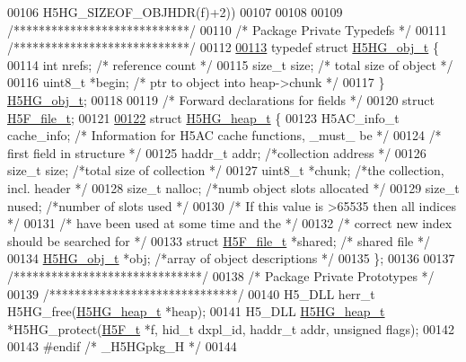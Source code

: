 \begin{DoxyCode}
00106 \textcolor{preprocessor}{                          H5HG\_SIZEOF\_OBJHDR(f)+2))}
00107 
00108 
00109 \textcolor{comment}{/****************************/}
00110 \textcolor{comment}{/* Package Private Typedefs */}
00111 \textcolor{comment}{/****************************/}
00112 
\hyperlink{struct_h5_h_g__obj__t}{00113} \textcolor{keyword}{typedef} \textcolor{keyword}{struct }\hyperlink{struct_h5_h_g__obj__t}{H5HG\_obj\_t} \{
00114     \textcolor{keywordtype}{int}         nrefs;      \textcolor{comment}{/* reference count                  */}
00115     \textcolor{keywordtype}{size\_t}      size;       \textcolor{comment}{/* total size of object             */}
00116     uint8\_t     *begin;     \textcolor{comment}{/* ptr to object into heap->chunk   */}
00117 \} \hyperlink{struct_h5_h_g__obj__t}{H5HG\_obj\_t};
00118 
00119 \textcolor{comment}{/* Forward declarations for fields */}
00120 \textcolor{keyword}{struct }\hyperlink{struct_h5_f__file__t}{H5F\_file\_t};
00121 
\hyperlink{struct_h5_h_g__heap__t}{00122} \textcolor{keyword}{struct }\hyperlink{struct_h5_h_g__heap__t}{H5HG\_heap\_t} \{
00123     H5AC\_info\_t cache\_info; \textcolor{comment}{/* Information for H5AC cache functions, \_must\_ be */}
00124                             \textcolor{comment}{/* first field in structure */}
00125     haddr\_t     addr;       \textcolor{comment}{/*collection address        */}
00126     \textcolor{keywordtype}{size\_t}      size;       \textcolor{comment}{/*total size of collection  */}
00127     uint8\_t     *chunk;     \textcolor{comment}{/*the collection, incl. header  */}
00128     \textcolor{keywordtype}{size\_t}      nalloc;     \textcolor{comment}{/*numb object slots allocated   */}
00129     \textcolor{keywordtype}{size\_t}      nused;      \textcolor{comment}{/*number of slots used      */}
00130                                         \textcolor{comment}{/* If this value is >65535 then all indices */}
00131                                         \textcolor{comment}{/* have been used at some time and the */}
00132                                         \textcolor{comment}{/* correct new index should be searched for */}
00133     \textcolor{keyword}{struct }\hyperlink{struct_h5_f__file__t}{H5F\_file\_t}   *shared;        \textcolor{comment}{/* shared file */}
00134     \hyperlink{struct_h5_h_g__obj__t}{H5HG\_obj\_t}    *obj;       \textcolor{comment}{/*array of object descriptions  */}
00135 \};
00136 
00137 \textcolor{comment}{/******************************/}
00138 \textcolor{comment}{/* Package Private Prototypes */}
00139 \textcolor{comment}{/******************************/}
00140 H5\_DLL herr\_t H5HG\_free(\hyperlink{struct_h5_h_g__heap__t}{H5HG\_heap\_t} *heap);
00141 H5\_DLL \hyperlink{struct_h5_h_g__heap__t}{H5HG\_heap\_t} *H5HG\_protect(\hyperlink{struct_h5_f__t}{H5F\_t} *f, hid\_t dxpl\_id, haddr\_t addr, \textcolor{keywordtype}{unsigned} flags);
00142 
00143 \textcolor{preprocessor}{#endif }\textcolor{comment}{/* \_H5HGpkg\_H */}\textcolor{preprocessor}{}
00144 
\end{DoxyCode}
